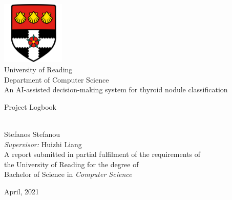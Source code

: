 \documentclass[a4paper,11pt,oneside]{book}
\begin{document}
	
	
	\frontmatter
	
	\begin{titlepage}      
		\begin{center}
			\includegraphics[width=3cm]{res/uorlogo.png}\\[0.5cm]
			{\LARGE University of Reading\\[0.5cm]
				Department of Computer Science}\\[2cm]
			
			
			\linespread{1.2}\huge {An AI-assisted decision-making system for thyroid nodule classification}
			
			\linespread{1.2}\huge {Project Logbook}
			
			\linespread{1}~\\[2cm]
			
			{\Large Stefanos Stefanou}\\[1cm] 
			
			{\large \emph{Supervisor:} Huizhi Liang}\\[1cm] %
			
			\large A report submitted in partial fulfilment of the requirements of\\the University of Reading for the degree of\\ Bachelor of Science in \textit{Computer Science}\\[0.3cm] 
			\vfill
			
			
			April, 2021%
		\end{center}
	\end{titlepage}
	\newpage
\end{document}
